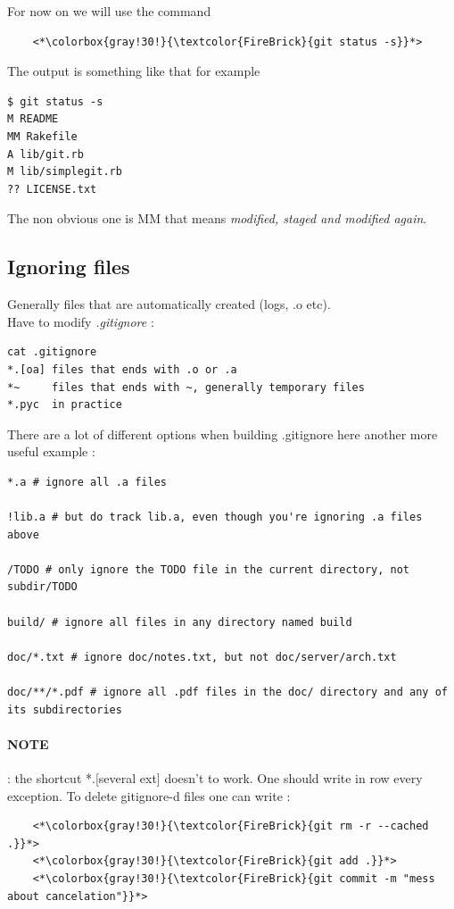 \documentclass[a4paper,12pt]{article}
\numberwithin{equation}{section} %
\begin{document}
For now on we will use the command 
\begin{lstlisting}
	<*\colorbox{gray!30!}{\textcolor{FireBrick}{git status -s}}*>
\end{lstlisting}
The output is something like that for example
\begin{lstlisting}
$ git status -s
M README
MM Rakefile
A lib/git.rb
M lib/simplegit.rb
?? LICENSE.txt
\end{lstlisting}
The non obvious one is MM that means \textit{modified, staged and modified again}.

\subsection*{Ignoring files}
Generally files that are automatically created (logs, .o etc).\\
Have to modify \textit{.gitignore} :
\begin{lstlisting}
cat .gitignore
*.[oa] files that ends with .o or .a
*~	   files that ends with ~, generally temporary files
*.pyc  in practice
\end{lstlisting}

There are a lot of different options when building .gitignore here another more useful example :
\begin{lstlisting}
*.a # ignore all .a files

!lib.a # but do track lib.a, even though you're ignoring .a files above

/TODO # only ignore the TODO file in the current directory, not subdir/TODO

build/ # ignore all files in any directory named build

doc/*.txt # ignore doc/notes.txt, but not doc/server/arch.txt

doc/**/*.pdf # ignore all .pdf files in the doc/ directory and any of its subdirectories
\end{lstlisting}

\paragraph*{NOTE} : the shortcut *.[several ext] doesn't to work. One should write in row every exception. To delete gitignore-d files one can write :
\begin{lstlisting}
	<*\colorbox{gray!30!}{\textcolor{FireBrick}{git rm -r --cached .}}*>
	<*\colorbox{gray!30!}{\textcolor{FireBrick}{git add .}}*>
	<*\colorbox{gray!30!}{\textcolor{FireBrick}{git commit -m "mess about cancelation"}}*>
\end{lstlisting}
\end{document}
